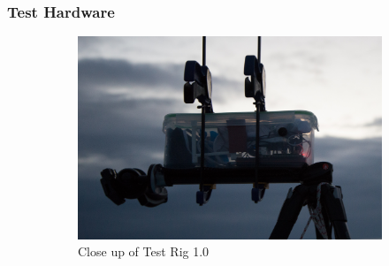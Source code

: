\subsubsection{\label{sec:discussion:equipment:hardware}Test Hardware}

\begin{figure}
\centering
\begin{subfigure}{.65\textwidth}
  \centering
  \includegraphics[width=.95\linewidth]{"./image/20150219-_BEN2653"}
  \caption{Close up of Test Rig 1.0}
  \label{fig:test_rig_1.0_tofino:sub1}
\end{subfigure}%
\begin{subfigure}{.35\textwidth}
  \centering

\end{subfigure}
\end{figure}
